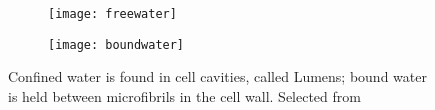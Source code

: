 \documentclass[a4paper,11pt]{report}
\begin{document}
\begin{figure}[h]

\begin{subfigure}{0.5\textwidth}
\texttt{[image: freewater]} 


\end{subfigure}
\begin{subfigure}{0.5\textwidth}
\texttt{[image: boundwater]}


\end{subfigure}
 


\caption{Confined water is found in cell cavities, called Lumens; bound water is held between microfibrils in the cell wall. Selected from \cite{duewood}}\label{wood}
\end{figure}
\end{document}
